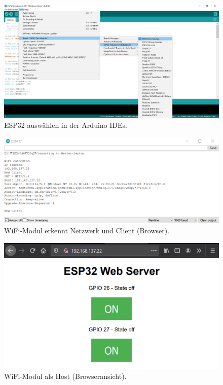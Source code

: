 \begin{figure}[H]
	\centering
	\includegraphics[width=\textwidth]{graphics/ESP32_Arduino_IDE}
	\caption{ESP32 auswählen in der Arduino IDEs.}
	\label{fig:ESP32_Arduino_IDE}
\end{figure}
%

\begin{figure}[H]
	\centering
	\includegraphics[width=\textwidth]{graphics/ESP32_Serial_Monitor}
	\caption{WiFi-Modul erkennt Netzwerk und Client (Browser).}
	\label{fig:ESP32_Serial_Monitor}
\end{figure}

\begin{figure}[H]
	\centering
	\includegraphics[width=\textwidth]{graphics/ESP32_Webserver}
	\caption{WiFi-Modul als Host (Browseransicht).}
	\label{fig:ESP32_Webserver}
\end{figure}